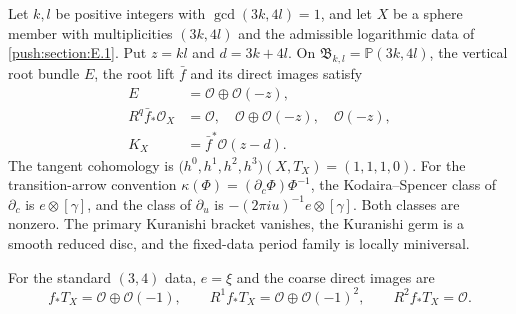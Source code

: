 \begin{theorem}\hypertarget{tag-032U}{}\label{push:src:E.2.1}
\hypertarget{tag-01RH}{}\label{fam:src:A.5.2}\label{fam:st:A.5.2}\label{inv:D1.3}\label{inv:D2.1}\label{inv:D3.1}\label{cdp:st:E9}
\hypertarget{tag-02YO}{}\label{night:P5.3}\label{stmt:P5.3}
\hypertarget{tag-02YP}{}\label{night:P5.4}\label{stmt:P5.4}
Let $k,l$ be positive integers with $\gcd(3k,4l)=1$, and let $X$
be a sphere member with multiplicities $(3k,4l)$ and the admissible
logarithmic data of \cref{push:section:E.1}. Put $z=kl$ and
$d=3k+4l$. On $\mathfrak B_{k,l}=\mathbb P(3k,4l)$, the vertical
root bundle $E$, the root lift $\bar f$ and its direct images satisfy
\[
 \begin{split}
 E&=\mathcal O\oplus\mathcal O(-z),\\
 R^q\bar f_*\mathcal O_X&=
 \mathcal O,\quad\mathcal O\oplus\mathcal O(-z),\quad\mathcal O(-z),\\
 K_X&=\bar f^*\mathcal O(z-d).
 \end{split}
\]
The tangent cohomology is
$\bigl(h^0,h^1,h^2,h^3\bigr)(X,T_X)=(1,1,1,0)$.
For the transition-arrow convention
$\kappa(\Phi)=(\partial_c\Phi)\Phi^{-1}$, the Kodaira--Spencer
class of $\partial_c$ is $e\otimes[\gamma]$, and the class of
$\partial_u$ is $-(2\pi i u)^{-1}e\otimes[\gamma]$.
Both classes are nonzero. The primary Kuranishi bracket vanishes,
the Kuranishi germ is a smooth reduced disc, and the fixed-data
period family is locally miniversal.

For the standard $(3,4)$ data, $e=\xi$ and the coarse direct
images are
\begin{equation}
 f_*T_X=\mathcal O\oplus\mathcal O(-1),\qquad
 R^1f_*T_X=\mathcal O\oplus\mathcal O(-1)^2,\qquad
 R^2f_*T_X=\mathcal O.
\label{pub:I:eq:D-4}
\end{equation}
\end{theorem}

